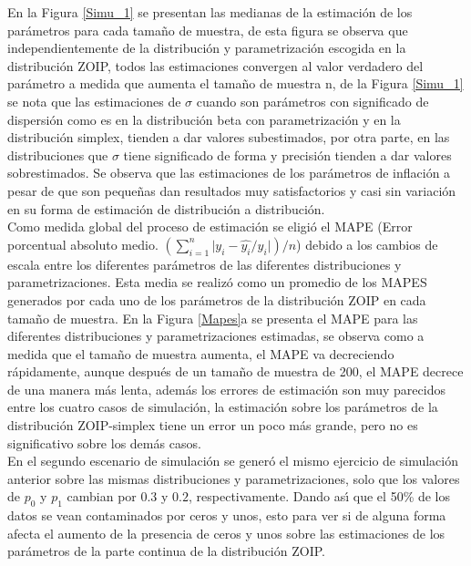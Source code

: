 En la Figura \ref{Simu_1} se presentan las medianas de la estimaci\'{o}n de los par\'{a}metros para cada tama\~{n}o de muestra, de esta figura se observa que independientemente de la distribuci\'{o}n y pa\-ra\-me\-tri\-za\-ci\-\'{o}n escogida en la distribuci\'{o}n ZOIP, todos las estimaciones convergen al valor verdadero del par\'{a}metro a medida que aumenta el tama\~{n}o de muestra n, de la Figura \ref{Simu_1} se nota que las estimaciones de $\sigma$ cuando son par\'{a}metros con significado de dispersi\'{o}n como es en la distribuci\'{o}n beta con parametrizaci\'{o}n \cite{Stasinopoulos2} y en la distribuci\'{o}n simplex, tienden a dar valores subestimados, por otra parte, en las distribuciones que $\sigma$ tiene significado de forma y precisi\'{o}n tienden a dar valores sobrestimados. Se observa que las estimaciones de los par\'{a}metros de inflaci\'{o}n a pesar de que son peque\~{n}as dan resultados muy satisfactorios y casi sin variaci\'{o}n en su forma de estimaci\'{o}n de distribuci\'{o}n a distribuci\'{o}n.\\

Como medida global del proceso de estimaci\'{o}n se eligi\'{o} el MAPE (Error porcentual absoluto medio. $(\sum_{i=1}^{n}{|y_i-\hat{y_i}/y_i}|)/n$) debido a los cambios de escala entre los diferentes par\'{a}metros de las diferentes distribuciones y parametrizaciones. Esta media se realiz\'{o} como un promedio de los MAPES generados por cada uno de los par\'{a}metros de la distribuci\'{o}n ZOIP en cada tama\~{n}o de muestra. En la Figura \ref{Mapes}a se presenta el MAPE para las diferentes distribuciones y parametrizaciones estimadas, se observa como a medida que el tama\~{n}o de muestra aumenta, el MAPE va decreciendo r\'{a}pidamente, aunque des\-pu\'{e}s de un tama\~{n}o de muestra de 200, el MAPE decrece de una manera m\'{a}s lenta, adem\'{a}s los errores de estimaci\'{o}n son muy parecidos entre los cuatro casos de simulaci\'{o}n, la estimaci\'{o}n sobre los par\'{a}metros de la distribuci\'{o}n ZOIP-simplex tiene un error un poco m\'{a}s grande, pero no es significativo sobre los dem\'{a}s casos.\\
 
En el segundo escenario de simulaci\'{o}n se gener\'{o} el mismo ejercicio de simulaci\'{o}n anterior sobre las mismas distribuciones y parametrizaciones, solo que los valores de $p_0$ y $p_1$ cambian por $0.3$ y $0.2$, respectivamente. Dando as\'{\i} que el 50\% de los datos se vean contaminados por ceros y unos, esto para ver si de alguna forma afecta el aumento de la presencia de ceros y unos sobre las estimaciones de los par\'{a}metros de la parte continua de la distribuci\'{o}n ZOIP.

